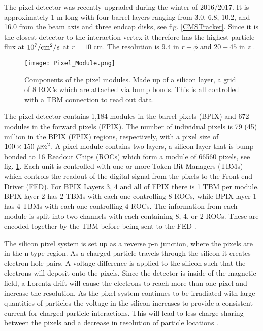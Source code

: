 The pixel detector was recently upgraded during the winter of 2016/2017. It is approximately 1 m long with four barrel layers ranging from 3.0, 6.8, 10.2, and 16.0 \cm{} from the beam axis and three endcap disks, see fig. \ref{CMSTracker}. Since it is the closest detector to the interaction vertex it therefore has the highest particle flux at $10^7/\text{cm}^2/s$ at $r=10$ cm. The resolution is $9.4$ \mum{} in $r-\phi$ and $20-45$ \mum{} in $z$ \cite{noauthor_cms_2012}.

\begin{figure}
 	\centering
	\texttt{[image: Pixel\_Module.png]}
 	\caption[Pixel Modules]{Components of the pixel modules. Made up of a silicon layer, a grid of 8 ROCs which are attached via bump bonds. This is all controlled with a TBM connection to read out data.}
 	\label{PixelModule} 
\end{figure}

The pixel detector contains 1,184 modules in the barrel pixels (BPIX) and 672 modules in the forward pixels (FPIX). The number of individual pixels is 79 (45) million in the BPIX (FPIX) regions, respectively, with a pixel size of $100\times150 \text{ }\text{}\mu m^2$. A pixel module contains two layers, a silicon layer that is bump bonded to 16 Readout Chips (ROCs) which form a module of 66560 pixels, see fig. \ref{PixelModule}. Each unit is controlled with one or more Token Bit Managers (TBMs) which controls the readout of the digital signal from the pixels to the Front-end Driver (FED). For BPIX Layers 3, 4 and all of FPIX there is 1 TBM per module. BPIX layer 2 has 2 TBMs with each one controlling 8 ROCs, while BPIX layer 1 has 4 TBMs with each one controlling 4 ROCs. The information from each module is split into two channels with each containing 8, 4, or 2 ROCs. These are encoded together by the TBM before being sent to the FED \cite{noauthor_cms_2012}.

The silicon pixel system is set up as a reverse p-n junction, where the pixels are in the n-type region. As a charged particle travels through the silicon it creates electron-hole pairs. A voltage difference is applied to the silicon such that the electrons will deposit onto the pixels. Since the detector is inside of the magnetic field, a Lorentz drift will cause the electrons to reach more than one pixel and increase the resolution. As the pixel system continues to be irradiated with large quantities of particles the voltage in the silicon increases to provide a consistent current for charged particle interactions. This will lead to less charge sharing between the pixels and a decrease in resolution of particle locations \cite{noauthor_cms_2012}. 

